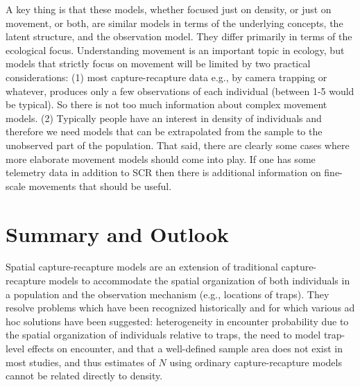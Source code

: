 A key thing is that these models, whether focused just on density, or
just on movement, or both, are similar models in terms of the
underlying concepts, the latent structure, and the observation
model. They differ
primarily in terms of the ecological focus. 
Understanding movement is an important topic in ecology, but models
that strictly focus on movement will be limited by two
practical considerations: (1) most capture-recapture data e.g., by
camera trapping or whatever, produces only a few observations of each
individual (between 1-5 would be typical). So there is not too much
information about complex movement models.  (2) Typically people have
an interest in density of individuals and therefore we need models
that can be extrapolated from the sample to the unobserved part of the
population.  
That said, there are
clearly some cases where more elaborate movement models should come
into play. If one has some telemetry data in addition to SCR then
there is additional information on fine-scale movements that should be
useful.










\section{Summary and Outlook}


Spatial capture-recapture models are an extension of traditional
capture-recapture models to accommodate the spatial organization of
both individuals in a population and the observation mechanism (e.g.,
locations of traps).  They resolve problems which have been recognized
historically and for which various ad hoc solutions have been
suggested: heterogeneity in encounter probability due to the spatial
organization of individuals relative to traps, the need to model
trap-level effects on encounter, and that a well-defined sample area
does not exist in most studies, and thus estimates of $N$ using
ordinary capture-recapture models cannot be related directly to
density.

